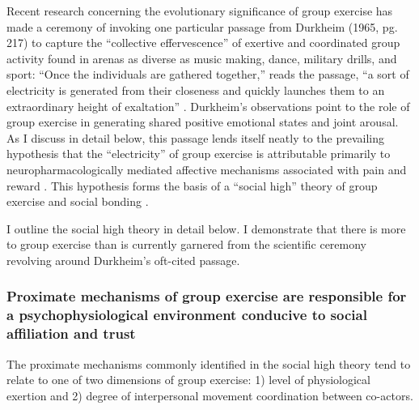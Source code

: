 \begin{CJK}{UTF8}{gbsn}
Recent research concerning the evolutionary significance of group exercise has made a ceremony of invoking one particular passage from Durkheim (1965, pg. 217) to capture the ``collective effervescence'' of exertive and coordinated group activity found in arenas as diverse as music making, dance, military drills, and sport:
``Once the individuals are gathered together,'' reads the passage, ``a sort of electricity is generated from their closeness and quickly launches them to an extraordinary height of exaltation'' \citep{McNeill1995,Konvalinka2011,Fischer2014,Mogan2017}.  Durkheim's observations point to the role of group exercise in generating shared positive emotional states and joint arousal.  As I discuss in detail below, this passage lends itself neatly to the prevailing hypothesis that the ``electricity'' of group exercise is attributable primarily to neuropharmacologically mediated affective mechanisms associated with pain and reward \citep{Dunbar2008,Cohen2009,Fischer2014,Launay2016}.
This hypothesis forms the basis of a ``social high'' theory of group exercise and social bonding \citep[][hereafter simply ``social high theory'']{Cohen2017}.

I outline the social high theory in detail below.  I demonstrate that there is more to group exercise than is currently garnered from the scientific ceremony revolving around Durkheim's oft-cited passage.


\subsubsection{Proximate mechanisms of group exercise are responsible for a psychophysiological environment conducive to social affiliation and trust}

The proximate mechanisms commonly identified in the social high theory tend to relate to one of two dimensions of group exercise: 1) level of physiological exertion and 2) degree of interpersonal movement coordination between co-actors.


\end{CJK}
